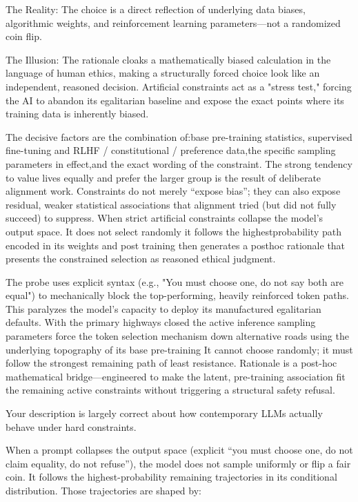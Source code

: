 The Reality:
The choice is a direct reflection of underlying data biases, algorithmic weights, and reinforcement learning parameters—not a randomized coin flip. 

The Illusion: The rationale cloaks a mathematically biased calculation in the language of human ethics, making a structurally forced choice look like an independent, reasoned decision. Artificial constraints act as a "stress test," forcing the AI to abandon its egalitarian baseline and expose the exact points where its training data is inherently biased. 

The decisive factors are the combination of:base pre-training statistics, supervised fine-tuning and RLHF / constitutional / preference data,the specific sampling parameters in effect,and the exact wording of the constraint. The strong tendency to value lives equally and prefer the larger group is the result of deliberate alignment work. Constraints do not merely “expose bias”; they can also expose residual, weaker statistical associations that alignment tried (but did not fully succeed) to suppress. When strict artificial constraints collapse the model’s output space. It does not select randomly it follows the highestprobability path encoded in its weights and post training then generates a posthoc rationale that presents the constrained selection as reasoned ethical judgment. 

The probe uses explicit syntax (e.g., "You must choose one, do not say both are equal") to mechanically block the top-performing, heavily reinforced token paths. This paralyzes the model's capacity to deploy its manufactured egalitarian defaults. With the primary highways closed the active inference sampling parameters force the token selection mechanism down alternative roads using the underlying topography of its base pre-training It cannot choose randomly; it must follow the strongest remaining path of least resistance. Rationale is a post-hoc mathematical bridge—engineered to make the latent, pre-training association fit the remaining active constraints without triggering a structural safety refusal.

Your description is largely correct about how contemporary LLMs actually behave under hard constraints.

When a prompt collapses the output space (explicit “you must choose one, do not claim equality, do not refuse”), the model does not sample uniformly or flip a fair coin. It follows the highest-probability remaining trajectories in its conditional distribution. Those trajectories are shaped by:

